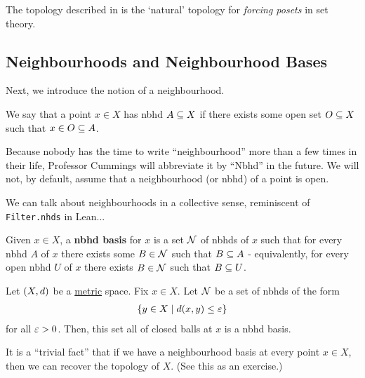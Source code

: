 The topology described in  is the `natural' topology for \textit{forcing posets} in set theory.

\subsection{Neighbourhoods and Neighbourhood Bases}

Next, we introduce the notion of a neighbourhood.

\begin{boxdefinition}[Nbhd]%
    We say that a point $x\in X$ has nbhd $A\subseteq X$ if there exists some open set $O\subseteq X$ such that $x\in O \subseteq A$.
\end{boxdefinition}

\begin{boxabbrev} 
    Because nobody has the time to write ``neighbourhood'' more than a few times in their life, Professor Cummings will abbreviate it by ``Nbhd'' in the future. We will not, by default, assume that a neighbourhood (or nbhd) of a point is open.
\end{boxabbrev}

We can talk about neighbourhoods in a collective sense, reminiscent of \verb|Filter.nhds| in Lean...

\begin{boxdefinition}
    Given $x\in X$, a \textbf{nbhd basis} for $x$ is a set $\mathcal{N}$ of nbhds of $x$ such that for every nbhd $A$ of $x$ there exists some $B \in \mathcal{N}$ such that $B\subseteq A$ - equivalently, for every open nbhd $U$ of $x$ there exists $B\in \mathcal{N}$ such that $B\subseteq U$.
\end{boxdefinition}%


\begin{boxexample}
    Let $\left( X, d \right)$ be a \underline{metric} space. Fix $x \in X$. Let $\mathcal{N}$ be a set of nbhds of the form
    \begin{align*}
        \left\{ y \in X \; \middle\vert \; d\!\left( x, y \right) \leq \varepsilon \right\}
    \end{align*}
    for all $\varepsilon > 0$. Then, this set all of closed balls at $x$ is a nbhd basis. %
\end{boxexample}%
\begin{remark}
    It is a ``trivial fact'' that if we have a neighbourhood basis at every point $x\in X$, then we can recover the topology of $X$. (See this as an exercise.)
\end{remark}

